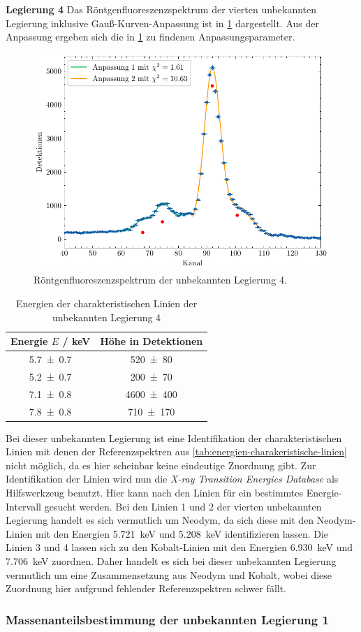 \noindent\textbf{Legierung 4}\newline
Das Röntgenfluoreszenzspektrum der vierten unbekannten Legierung inklusive Gauß-Kurven-Anpassung ist in \cref{fig:unbekannt4} dargestellt. Aus der Anpassung ergeben sich die
in \cref{tab:unbekannt4} zu findenen Anpassungsparameter.
\begin{figure}[H]
	\centering
	\includegraphics[width=0.6\linewidth]{../figs/Unbekannt4.pdf}
	\caption{Röntgenfluoreszenzspektrum der unbekannten Legierung 4.}
	\label{fig:unbekannt4}
\end{figure}
\begin{table}[H]
    \centering
    \caption{Energien der charakteristischen Linien der unbekannten Legierung 4}
    \label{tab:unbekannt4}
    \begin{tabular}{c|c}
       Energie $E$ / \unit{\kilo\electronvolt} & Höhe in Detektionen \\
\hline
\num{5.7\pm 0.7} & \num{520\pm 80} \\ 
\num{5.2\pm 0.7} & \num{200\pm 70} \\ 
\num{7.1\pm 0.8} & \num{4600\pm 400} \\ 
\num{7.8\pm 0.8} & \num{710\pm 170} \\ 

    \end{tabular}
\end{table} Bei dieser unbekannten Legierung ist eine Identifikation der charakteristischen Linien mit denen der Referenzspektren aus \cref{tab:energien-charakeristische-linien}
nicht möglich, da es hier scheinbar keine eindeutige Zuordnung gibt. Zur Identifikation der Linien wird nun die \textit{X-ray Transition Energies Database} \cite{nist_xray_database}
als Hilfswerkzeug benutzt. Hier kann nach den Linien für ein bestimmtes Energie-Intervall gesucht werden. Bei den Linien 1 und 2 der vierten unbekannten Legierung
handelt es sich vermutlich um Neodym, da sich diese mit den Neodym-Linien mit den Energien \SI{5,721}{\kilo \electronvolt} und \SI{5,208}{\kilo \electronvolt}
identifizieren lassen. Die Linien 3 und 4 lassen sich zu den Kobalt-Linien mit den Energien \SI{6,930}{\kilo \electronvolt} und \SI{7,706}{\kilo \electronvolt}
zuordnen. Daher handelt es sich bei dieser unbekannten Legierung vermutlich um eine Zusammensetzung aus Neodym und Kobalt, wobei diese Zuordnung hier
aufgrund fehlender Referenzspektren schwer fällt.
\subsubsection*{Massenanteilsbestimmung der unbekannten Legierung 1}\label{subsubsec:massenanteile}